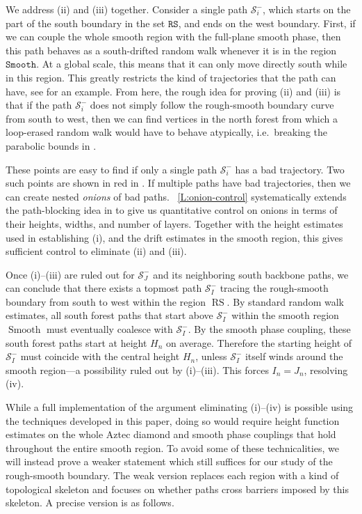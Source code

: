 \documentclass[11pt,twoside]{amsart}
\theoremstyle{plain}
\numberwithin{quest}{section}
\theoremstyle{remark}
\numberwithin{rem}{section}
\theoremstyle{definition}
\newcommand{\cS}{\mathcal{S}}
\renewcommand{\tt}[1]{{\mathtt{#1}}}
\begin{document}
    We address (ii) and (iii) together. Consider a single path $\cS_i^-$, which starts on the part of the south boundary in the set $\tt{RS}$, and ends on the west boundary. First, if we can couple the whole smooth region with the full-plane smooth phase, then this path behaves as a south-drifted random walk whenever it is in the region $\tt{Smooth}$. At a global scale, this means that it can only move directly south while in this region. This greatly restricts the kind of trajectories that the path can have, see  for an example. From here, the rough idea for proving (ii) and (iii) is that if the path $\mathcal S_i^-$ does not simply follow the rough-smooth boundary curve from south to west, then we can find vertices in the north forest from which a loop-erased random walk would have to behave atypically, i.e.\ breaking the parabolic bounds in . 
    
    These points are easy to find if only a single path $\cS_i^-$ has a bad trajectory. Two such points are shown in red in . If multiple paths have bad trajectories, then we can create nested \textit{onions} of bad paths. 
	~\cref{L:onion-control} systematically extends the path-blocking idea in  to give us quantitative control on onions in terms of their heights, widths, and number of layers. Together with the height estimates used in establishing (i), and the drift estimates in the smooth region, this  gives sufficient control to eliminate (ii) and (iii).
    
	
	Once (i)--(iii) are ruled out for $\cS_J^-$ and its neighboring south backbone 
	paths, we can conclude that there exists a topmost path $\cS_I^-$ tracing the 
	rough-smooth boundary from south to west within the region $\operatorname{RS}$. 
	By standard random walk estimates, all south forest paths that start above 
	$\cS_I^-$ within the smooth region $\operatorname{Smooth}$ must eventually coalesce with 
	$\cS_I^-$. By the smooth phase coupling, these south forest paths start at height $H_n$ on average. Therefore the starting height 
	of $\cS_I^-$ must coincide with the central height $H_n$, unless $\cS_I^-$ itself 
	winds around the smooth region—a possibility ruled out by (i)--(iii). 
	This forces $I_n = J_n$, resolving (iv).
	
	While a full implementation of the argument eliminating (i)--(iv) is possible using the techniques developed in this paper, doing so would require height function estimates on the whole Aztec diamond and smooth phase couplings that hold throughout the entire smooth region. To avoid some of these technicalities, we will instead prove a weaker statement which still suffices for our study of the rough-smooth boundary. The weak version replaces each region with a kind of topological skeleton and focuses on whether paths cross barriers imposed by this skeleton. A precise version is as follows.
	
\end{document}
